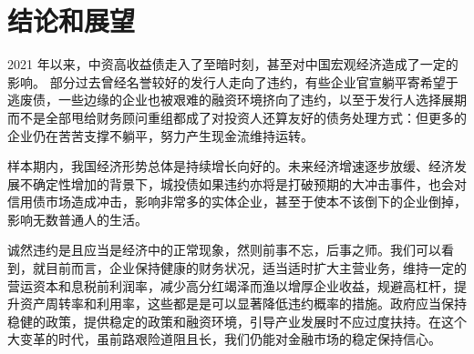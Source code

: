 
\chapter{结论和展望}

2021 年以来，中资高收益债走入了至暗时刻，甚至对中国宏观经济造成了一定的影响。
部分过去曾经名誉较好的发行人走向了违约，有些企业官宣躺平寄希望于逃废债，一些边缘的企业也被艰难的融资环境挤向了违约，以至于发行人选择展期而不是全部甩给财务顾问重组都成了对投资人还算友好的债务处理方式：但更多的企业仍在苦苦支撑不躺平，努力产生现金流维持运转。

样本期内，我国经济形势总体是持续增长向好的。未来经济增速逐步放缓、经济发展不确定性增加的背景下，城投债如果违约亦将是打破预期的大冲击事件，也会对信用债市场造成冲击，影响非常多的实体企业，甚至于使本不该倒下的企业倒掉，影响无数普通人的生活。

诚然违约是且应当是经济中的正常现象，然则前事不忘，后事之师。我们可以看到，就目前而言，企业保持健康的财务状况，适当适时扩大主营业务，维持一定的营运资本和息税前利润率，减少高分红竭泽而渔以增厚企业收益，规避高杠杆，提升资产周转率和利用率，这些都是是可以显著降低违约概率的措施。政府应当保持稳健的政策，提供稳定的政策和融资环境，引导产业发展时不应过度扶持。在这个大变革的时代，虽前路艰险道阻且长，我们仍能对金融市场的稳定保持信心。
